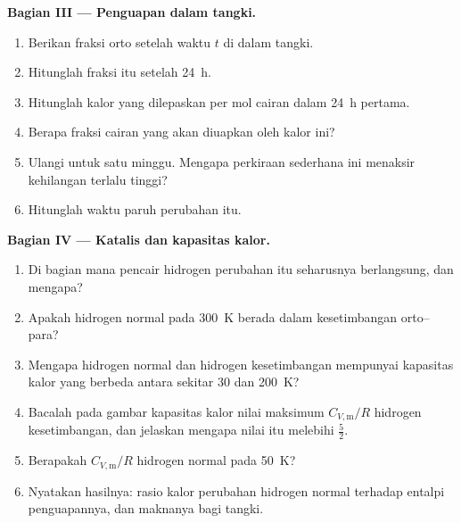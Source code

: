 \begin{problem}
\medskip\noindent\textbf{Bagian III --- Penguapan dalam tangki.}
\begin{enumerate}[resume, beginpenalty=10000]
  \item Berikan fraksi orto setelah waktu $t$ di dalam tangki.
  \item Hitunglah fraksi itu setelah \qty{24}{h}.
  \item Hitunglah kalor yang dilepaskan per mol cairan dalam \qty{24}{h}
        pertama.
  \item Berapa fraksi cairan yang akan diuapkan oleh kalor ini?
  \item Ulangi untuk satu minggu. Mengapa perkiraan sederhana ini menaksir
        kehilangan terlalu tinggi?
  \item Hitunglah waktu paruh perubahan itu.
\end{enumerate}

\medskip\noindent\textbf{Bagian IV --- Katalis dan kapasitas kalor.}
\begin{enumerate}[resume, beginpenalty=10000]
  \item Di bagian mana pencair hidrogen perubahan itu seharusnya berlangsung,
        dan mengapa?
  \item Apakah hidrogen normal pada \qty{300}{K} berada dalam kesetimbangan
        orto--para?
  \item Mengapa hidrogen normal dan hidrogen kesetimbangan mempunyai kapasitas
        kalor yang berbeda antara sekitar 30 dan \qty{200}{K}?
  \item Bacalah pada gambar kapasitas kalor nilai maksimum $C_{V,\mathrm m}/R$
        hidrogen kesetimbangan, dan jelaskan mengapa nilai itu melebihi
        $\frac52$.
  \item Berapakah $C_{V,\mathrm m}/R$ hidrogen normal pada \qty{50}{K}?
  \item Nyatakan hasilnya: rasio kalor perubahan hidrogen normal terhadap
        entalpi penguapannya, dan maknanya bagi tangki.
\end{enumerate}
\end{problem}
